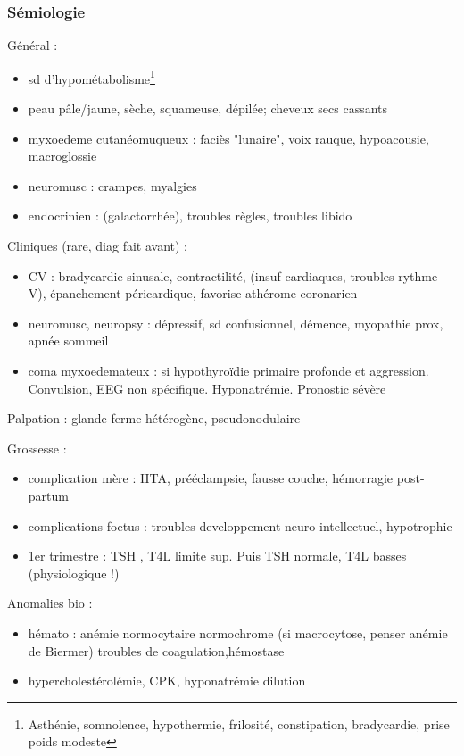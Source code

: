 \documentclass[11pt]{article}
\begin{document}
\subsubsection{Sémiologie}
\label{sec:org693fd8f}
Général :
\begin{itemize}
\item sd d'hypométabolisme\footnote{Asthénie, somnolence, hypothermie, frilosité, constipation, bradycardie,
prise poids modeste}
\item peau pâle/jaune, sèche, squameuse, dépilée; cheveux secs cassants
\item myxoedeme cutanéomuqueux : faciès "lunaire", voix rauque, hypoacousie,
macroglossie
\item neuromusc : crampes, myalgies
\item endocrinien : (galactorrhée), troubles règles, troubles libido
\end{itemize}
Cliniques (rare, diag fait avant) :
\begin{itemize}
\item CV : bradycardie sinusale, \dec contractilité, (insuf cardiaques, troubles
rythme V), épanchement péricardique, favorise athérome coronarien
\item neuromusc, neuropsy : dépressif, sd confusionnel, démence, myopathie prox,
apnée sommeil
\item coma myxoedemateux : si hypothyroïdie primaire profonde et
aggression. Convulsion, EEG non spécifique. Hyponatrémie. Pronostic sévère
\end{itemize}

Palpation : glande ferme hétérogène, pseudonodulaire

Grossesse : 
\begin{itemize}
\item complication mère : HTA, prééclampsie, fausse couche, hémorragie post-partum
\item complications foetus : troubles developpement neuro-intellectuel, hypotrophie
\item 1er trimestre : TSH \dec, T4L limite sup. Puis TSH normale, T4L basses
(physiologique !)
\end{itemize}

Anomalies bio :
\begin{itemize}
\item hémato : anémie normocytaire normochrome (si macrocytose, penser anémie de
Biermer) troubles de coagulation,hémostase
\item hypercholestérolémie, \inc CPK, hyponatrémie dilution
\end{itemize}
\end{document}
